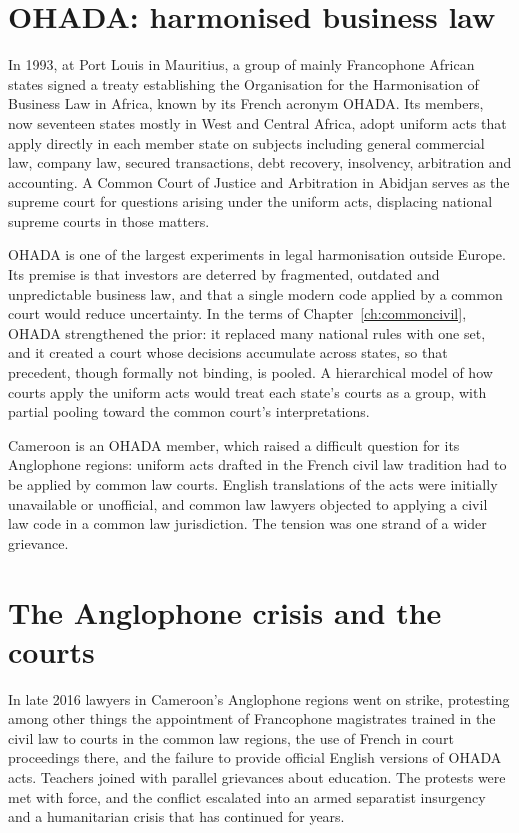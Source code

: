 \section{OHADA: harmonised business law}

In 1993, at Port Louis in Mauritius, a group of mainly Francophone African states signed a treaty establishing the Organisation for the Harmonisation of Business Law in Africa, known by its French acronym OHADA. Its members, now seventeen states mostly in West and Central Africa, adopt uniform acts that apply directly in each member state on subjects including general commercial law, company law, secured transactions, debt recovery, insolvency, arbitration and accounting. A Common Court of Justice and Arbitration in Abidjan serves as the supreme court for questions arising under the uniform acts, displacing national supreme courts in those matters.

OHADA is one of the largest experiments in legal harmonisation outside Europe. Its premise is that investors are deterred by fragmented, outdated and unpredictable business law, and that a single modern code applied by a common court would reduce uncertainty. In the terms of Chapter~\ref{ch:commoncivil}, OHADA strengthened the prior: it replaced many national rules with one set, and it created a court whose decisions accumulate across states, so that precedent, though formally not binding, is pooled. A hierarchical model of how courts apply the uniform acts would treat each state's courts as a group, with partial pooling toward the common court's interpretations.

Cameroon is an OHADA member, which raised a difficult question for its Anglophone regions: uniform acts drafted in the French civil law tradition had to be applied by common law courts. English translations of the acts were initially unavailable or unofficial, and common law lawyers objected to applying a civil law code in a common law jurisdiction. The tension was one strand of a wider grievance.

\section{The Anglophone crisis and the courts}

In late 2016 lawyers in Cameroon's Anglophone regions went on strike, protesting among other things the appointment of Francophone magistrates trained in the civil law to courts in the common law regions, the use of French in court proceedings there, and the failure to provide official English versions of OHADA acts. Teachers joined with parallel grievances about education. The protests were met with force, and the conflict escalated into an armed separatist insurgency and a humanitarian crisis that has continued for years.

